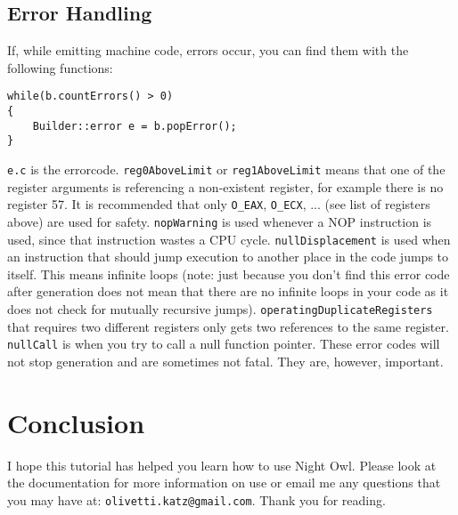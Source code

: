 \documentclass[10pt,a4paper]{article}
\begin{document}
\subsection{Error Handling}
If, while emitting machine code, errors occur, you can find them with the following functions:
\begin{verbatim}
while(b.countErrors() > 0)
{
	Builder::error e = b.popError();
}
\end{verbatim}

\verb|e.c| is the errorcode. \verb|reg0AboveLimit| or \verb|reg1AboveLimit| means that one of the register arguments is referencing a non-existent register, for example there is no register 57. It is recommended that only \verb|O_EAX|, \verb|O_ECX|, ... (see list of registers above) are used for safety. \verb|nopWarning| is used whenever a NOP instruction is used, since that instruction wastes a CPU cycle. \verb|nullDisplacement| is used when an instruction that should jump execution to another place in the code jumps to itself. This means infinite loops (note: just because you don't find this error code after generation does not mean that there are no infinite loops in your code as it does not check for mutually recursive jumps). \verb|operatingDuplicateRegisters| that requires two different registers only gets two references to the same register. \verb|nullCall| is when you try to call a null function pointer. These error codes will not stop generation and are sometimes not fatal. They are, however, important. 

\section{Conclusion}
I hope this tutorial has helped you learn how to use Night Owl. Please look at the documentation for more information on use or email me any questions that you may have at: \verb|olivetti.katz@gmail.com|. Thank you for reading.
\end{document}
